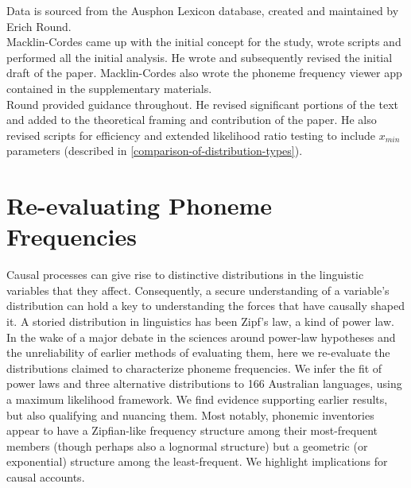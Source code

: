 \noindent
Data is sourced from the Ausphon Lexicon database, created and maintained by Erich Round.\\

\noindent
Macklin-Cordes came up with the initial concept for the study, wrote scripts and performed all the initial analysis. He wrote and subsequently revised the initial draft of the paper. Macklin-Cordes also wrote the phoneme frequency viewer app contained in the supplementary materials.\\

\noindent
Round provided guidance throughout. He revised significant portions of the text and added to the theoretical framing and contribution of the paper. He also revised scripts for efficiency and extended likelihood ratio testing to include $x_{min}$ parameters (described in \ref{comparison-of-distribution-types}).


\chapter[Re-evaluating phoneme frequencies]{Re-evaluating Phoneme Frequencies}
\label{Chap:phon-freqs}	%
\pagestyle{headings}

Causal processes can give rise to distinctive distributions in the linguistic variables that they affect. Consequently, a secure understanding of a variable's distribution can hold a key to understanding the forces that have causally shaped it. A storied distribution in linguistics has been Zipf's law, a kind of power law. In the wake of a major debate in the sciences around power-law hypotheses and the unreliability of earlier methods of evaluating them, here we re-evaluate the distributions claimed to characterize phoneme frequencies. We infer the fit of power laws and three alternative distributions to 166 Australian languages, using a maximum likelihood framework. We find evidence supporting earlier results, but also qualifying and nuancing them. Most notably, phonemic inventories appear to have a Zipfian-like frequency structure among their most-frequent members (though perhaps also a lognormal structure) but a geometric (or exponential) structure among the least-frequent. We highlight implications for causal accounts.

